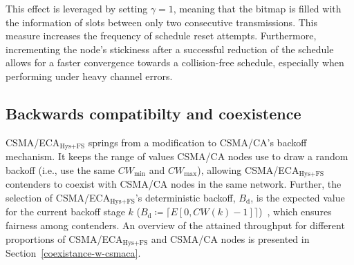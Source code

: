 		This effect is leveraged by setting $\gamma=1$, meaning that the bitmap is filled with the information of slots between only two consecutive transmissions. This measure increases the frequency of schedule reset attempts. Furthermore, incrementing the node's stickiness after a successful reduction of the schedule allows for a faster convergence towards a collision-free schedule, especially when performing under heavy channel errors. 
	
	\subsection{Backwards compatibilty and coexistence}
	CSMA/ECA$_{\text{Hys+FS}}$ springs from a modification to CSMA/CA's backoff mechanism. It keeps the range of values CSMA/CA nodes use to draw a random backoff (i.e., use the same $CW_{\min}$ and $CW_{\max}$), allowing CSMA/ECA$_{\text{Hys+FS}}$ contenders to coexist with CSMA/CA nodes in the same network. Further, the selection of CSMA/ECA$_{\text{Hys+FS}}$'s deterministic backoff, $B_{\text{d}}$, is the expected value for the current backoff stage $k$ ($B_{\text{d}}\coloneqq\lceil{E[0,CW(k)-1]}\rceil$)~\cite{research2standards}, which ensures fairness among contenders. An overview of the attained throughput for different proportions of CSMA/ECA$_{\text{Hys+FS}}$ and CSMA/CA nodes is presented in Section~\ref{coexistance-w-csmaca}.